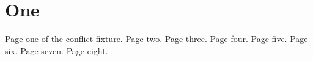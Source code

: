 \documentclass[11pt,oneside]{book}
\begin{document}
\chapter{One}
Page one of the conflict fixture.
\newpage Page two. \newpage Page three. \newpage Page four. \newpage Page five.
\newpage Page six. \newpage Page seven. \newpage Page eight.
\end{document}
